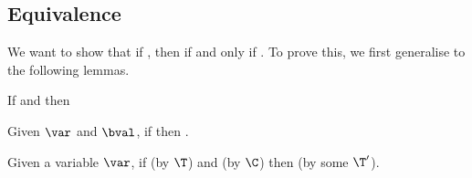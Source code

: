 \subsection{Equivalence}

We want to show that if \trahb{\hbctx}{\envnil}{\bexp}{\hexp}, then \hev{\hexp}{\n{\nat}} if and only if \bev{\envnil}{\bexp}{\n{\nat}}.
To prove this, we first generalise to the following lemmas.

\begin{lemma}
\label{lem:substitution-cor}
If \corhb{\hbxtx}{\bval}{\hexp} and  then 
\end{lemma}

\begin{lemma}
\label{lem:substitution-lookup}
Given $\var$ and $\bval$, if  then .
\end{lemma}

\begin{lemma}
\label{lem:substitution-trans}
Given a variable $\var$, if \trahb{\hbctx}{\benv}{\bexp}{\hexp} (by $\T$) and \corhb{\hbctx}{\bval}{\hval} (by $\C$) then \trahb{\hbctx}{\sub{\benv}{\bval}{\var}}{\bexp}{\sub{\hexp}{\hval}{\var}} (by some $\T'$).
\end{lemma}

